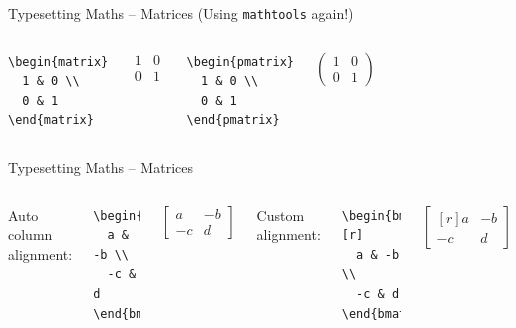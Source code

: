 \documentclass[t]{beamer}
\begin{document}
\begin{frame}[fragile]{Typesetting Maths -- Matrices}
  (Using \texttt{mathtools} again!)
  \begin{columns}[t]
    \begin{verbatim}
\begin{matrix}
  1 & 0 \\
  0 & 1
\end{matrix}
    \end{verbatim}

    $$
      \begin{matrix}
        1 & 0 \\
        0 & 1
      \end{matrix}
    $$

    \begin{verbatim}
\begin{pmatrix}
  1 & 0 \\
  0 & 1
\end{pmatrix}
    \end{verbatim}

    $$
      \begin{pmatrix}
        1 & 0 \\
        0 & 1
      \end{pmatrix}
    $$
  \end{columns}
\end{frame}

\begin{frame}[fragile]{Typesetting Maths -- Matrices}
  \begin{columns}[t]
    Auto column alignment:

    \begin{verbatim}
\begin{bmatrix}
  a & -b \\
  -c & d
\end{bmatrix}
    \end{verbatim}

    $$
      \begin{bmatrix}
        a & -b \\
        -c & d
      \end{bmatrix}
    $$

    Custom alignment:

    \begin{verbatim}
\begin{bmatrix*}[r]
  a & -b \\
  -c & d
\end{bmatrix*}
    \end{verbatim}

    $$
      \begin{bmatrix*}[r]
        a & -b \\
        -c & d
      \end{bmatrix*}
    $$
  \end{columns}
\end{frame}
\end{document}

